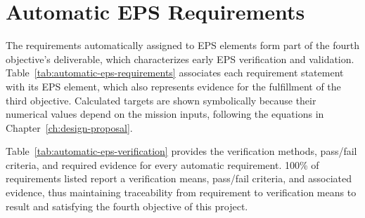 \chapter{Automatic EPS Requirements}
\label{appendix:automatic-eps-requirements}

The requirements automatically assigned to EPS elements form part of the fourth objective's deliverable, which characterizes early EPS verification and validation.
Table~\ref{tab:automatic-eps-requirements} associates each requirement statement with its EPS element, which also represents evidence for the fulfillment of the third objective.
Calculated targets are shown symbolically because their numerical values depend on the mission inputs, following the equations in Chapter~\ref{ch:design-proposal}.

Table~\ref{tab:automatic-eps-verification} provides the verification methods, pass/fail criteria, and required evidence for every automatic requirement. 100\% of requirements listed report a verification means, pass/fail criteria, and associated evidence, thus maintaining traceability from requirement to verification means to result and satisfying the fourth objective of this project.

